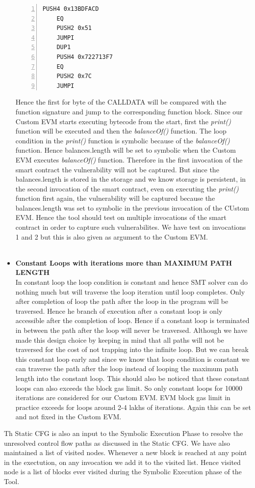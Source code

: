 \begin{itemize}
    \begin{Verbatim}[numbers=left,xleftmargin=5mm]
        PUSH4 0x13BDFACD 
	EQ 
	PUSH2 0x51 
	JUMPI 
	DUP1 
	PUSH4 0x722713F7 
	EQ 
	PUSH2 0x7C 
	JUMPI
    \end{Verbatim}
    Hence the first for byte of the CALLDATA will be compared with the function signature and jump to the corresponding function block. Since our Custom EVM starts executing bytecode from the start, first the \emph{print()} function will be executed and then the \emph{balanceOf()} function. The loop condition in the \emph{print()} function is symbolic because of the \emph{balanceOf()} function. Hence balances.length will be set to symbolic when the Custom EVM executes \emph{balanceOf()} function. Therefore in the first invocation of the smart contract the vulnerability will not be captured. But since the balances.length is stored in the storage and we know storage is persistent, in the second invocation of the smart contract, even on executing the \emph{print()} function first again, the vulnerability will be captured because the balances.length was set to symbolic in the previous invocation of the CUstom EVM. Hence the tool should test on multiple invocations of the smart contract in order to capture such vulnerabilites. We have test on invocations 1 and 2 but this is also given as argument to the Custom EVM.\\
    \\
    \item \textbf{Constant Loops with iterations more than MAXIMUM PATH LENGTH}\\
    In constant loop the loop condition is constant and hence SMT solver can do nothing much but will traverse the loop iteration until loop completes. Only after completion of loop the path after the loop in the program will be traversed. Hence he branch of execution after a constant loop is only accessible after the completion of loop. Hence if a constant loop is terminated in between the path after the loop will never be traversed. Although we have made this design choice by keeping in mind that all paths will not be traversed for the cost of not trapping into the infinite loop. But we can break this constant loop early and since we know that loop condition is constant we can traverse the path after the loop instead of looping the maximum path length into the constant loop.
    This should also be noticed that these constant loops can also exceeds the block gas limit. So only constant loops for 10000 iterations are considered for our Custom EVM. EVM block gas limit in practice exceeds for loops around 2-4 lakhs of iterations. Again this can be set and not fixed in the Custom EVM.
\end{itemize}
Th Static CFG is also an input to the Symbolic Execution Phase to resolve the unresolved control flow paths as discussed in the Static CFG. We have also maintained a list of visited nodes. Whenever a new block is reached at any point in the exectution, on any invocation we add it to the visited list. Hence visited node is a list of blocks ever visited during the Symbolic Execution phase of the Tool.

